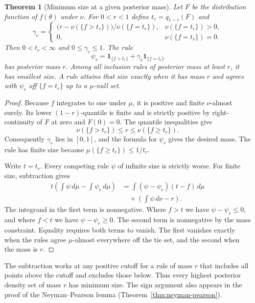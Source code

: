 \documentclass[11pt,oneside]{book}
\newtheorem{theorem}{Theorem}[chapter]
\theoremstyle{definition}
\theoremstyle{remark}
\begin{document}
\begin{theorem}[Minimum size at a given posterior mass]
\label{thm:bayesian-highest-density-minimum}
Let $F$ be the distribution function of $f(\theta)$ under $\nu$.
For $0<r<1$ define $t_r=q_{1-r}(F)$ and
\[
\gamma_r=
\begin{cases}
\bigl(r-\nu(\{f>t_r\})\bigr)/\nu(\{f=t_r\}), & \nu(\{f=t_r\})>0,\\
0, & \nu(\{f=t_r\})=0.
\end{cases}
\]
Then $0<t_r<\infty$ and $0\leq\gamma_r\leq1$. The rule
\[
\psi_r=\mathbf 1_{\{f>t_r\}}+\gamma_r\mathbf 1_{\{f=t_r\}}
\]
has posterior mass $r$. Among all inclusion rules of posterior mass
at least $r$, it has smallest size. A rule attains that size exactly
when it has mass $r$ and agrees with $\psi_r$ off $\{f=t_r\}$ up to
a $\mu$-null set.
\end{theorem}
\begin{proof}
Because $f$ integrates to one under $\mu$, it is positive and finite
$\nu$-almost surely. Its lower $(1-r)$-quantile is finite and is
strictly positive by right-continuity of $F$ at zero and $F(0)=0$.
The quantile inequalities give
\[
\nu(\{f>t_r\})\leq r\leq \nu(\{f\geq t_r\}).
\]
Consequently $\gamma_r$ lies in $[0,1]$, and the formula for
$\psi_r$ gives the desired mass. The rule has finite size
because $\mu(\{f\geq t_r\})\leq 1/t_r$.

Write $t=t_r$. Every competing rule $\psi$ of infinite size is
strictly worse. For finite size, subtraction gives
\begin{align*}
t\left(\int\psi\,d\mu-\int\psi_r\,d\mu\right)
&=\int(\psi-\psi_r)(t-f)\,d\mu\\
&\quad+\left(\int\psi\,d\nu-r\right).
\end{align*}
The integrand in the first term is nonnegative. Where $f>t$
we have $\psi-\psi_r\leq0$, and where $f<t$ we have
$\psi-\psi_r\geq0$. The second term is nonnegative by the mass
constraint. Equality requires both terms to vanish. The first
vanishes exactly when the rules agree $\mu$-almost everywhere
off the tie set, and the second when the mass is $r$.
\end{proof}

The subtraction works at any positive cutoff for a rule of mass $r$
that includes all points above the cutoff and excludes those below.
Thus every highest posterior density set of mass $r$ has minimum
size. The sign argument also appears in the proof of the
Neyman--Pearson lemma (Theorem~\ref{thm:neyman-pearson}).
\end{document}
